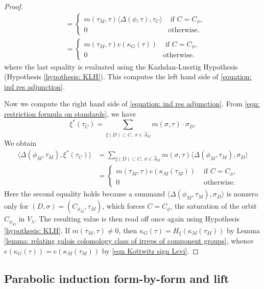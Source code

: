 \documentclass[11pt,letterpaper]{amsart}
\newcommand{\irrepdual}[1]{\widehat{#1}}
\newcommand{\stsh}[2]{{#1}_{#2}}
\renewcommand{\1}{\mathbbm{1}}
\numberwithin{equation}{section}
\begin{document}
{\begin{proof}
\begin{align*}
          &=\begin{cases}
             m(\tau_M,\tau)\langle \Delta(\phi,\tau),\stsh{\tau}{C} \rangle & \text{ if } C=C_\phi,\\
             0 & \text{otherwise}.
          \end{cases}  \\
          &=\begin{cases}
             m(\tau_M,\tau) e(\kappa_G(\tau)) & \text{ if } C=C_\phi,\\
             0 & \text{otherwise}. 
          \end{cases}  
    \end{align*}
where the last equality is evaluated using the Kazhdan-Lusztig Hypothesis (Hypothesis \ref{hypothesis: KLH}). This computes the left hand side of \eqref{equation: ind res adjunction}.

Now we compute the right hand side of \eqref{equation: ind res adjunction}.
From  \eqref{eqn: restriction formula on standards}, we have
\[\xi^*(\stsh{\tau}{C}) = \sum_{\xi(D)\subset C,~\sigma \in \irrepdual{A}_D} m(\sigma,\tau) \cdot \stsh{\sigma}{D}.\] 
We obtain
\begin{align*}
     \langle \Delta(\phi_M,\tau_M), {\xi^*(\stsh{\tau}{C})}\rangle &= \displaystyle\sum_{\xi(D)\subset C,~\sigma \in \irrepdual{A}_D}m(\sigma,\tau)\langle \Delta(\phi_M,\tau_M),\stsh{\sigma}{D}\rangle \\&=\begin{cases}
         m(\tau_M,\tau) e(\kappa_M(\tau_M)) & \text{ if } C=C_\phi,\\
         0 & \text{ otherwise.}
         \end{cases}
\end{align*}
Here the second equality holds because a summand $\langle \Delta(\phi_M,\tau_M),\stsh{\sigma}{D}\rangle$ is nonzero only for $(D,\sigma)=(C_{\phi_M},\tau_M)$, which forces $C=C_\phi$, the saturation of the orbit $C_{\phi_M}$ in $V_\lambda$. The resulting value is then read off once again using Hypothesis \ref{hypothesis: KLH}. If $m(\tau_M,\tau)\neq 0$, then $\kappa_G(\tau)=H_\xi(\kappa_M(\tau_M))$ by Lemma \ref{lemma: relating galois colomology class of irreps of component groups}, whence $e(\kappa_G(\tau))=e(\kappa_M(\tau_M))$ by \eqref{eqn Kottwitz sign Levi}. 
\end{proof}


\subsection{Parabolic induction form-by-form and lift}\label{subsection: parabolic induction form-by-form and lift}


}
\end{document}
